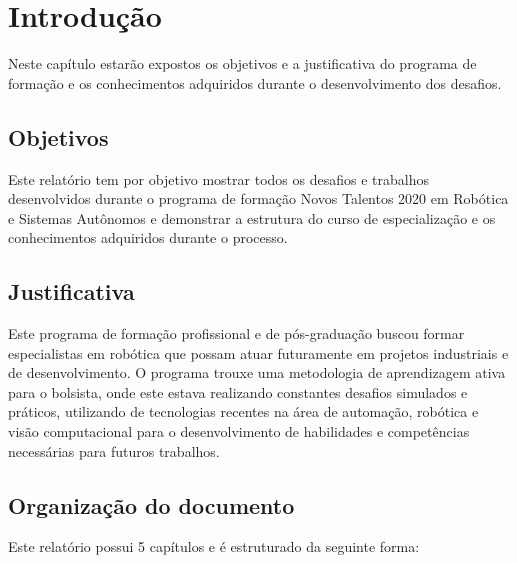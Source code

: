 \chapter{Introdução}
\label{chap:intro}

Neste capítulo estarão expostos os objetivos e a justificativa do programa de formação e os conhecimentos adquiridos durante o desenvolvimento dos desafios.

\section{Objetivos}
\label{sec:obj}

Este relatório tem por objetivo mostrar todos os desafios e trabalhos desenvolvidos durante o programa de formação Novos Talentos 2020 em Robótica e Sistemas Autônomos e demonstrar a estrutura do curso de especialização e os conhecimentos adquiridos durante o processo.

\section{Justificativa}
\label{sec:justi}

Este programa de formação profissional e de pós-graduação buscou formar especialistas em robótica que possam atuar futuramente em projetos industriais e de desenvolvimento. O programa trouxe uma metodologia de aprendizagem ativa para o bolsista, onde este estava realizando constantes desafios simulados e práticos, utilizando de tecnologias recentes na área de automação, robótica e visão computacional para o desenvolvimento de habilidades e competências necessárias para futuros trabalhos.




\section{Organização do documento}
\label{section:organizacao}

Este relatório possui 5 capítulos e é estruturado da seguinte forma:

